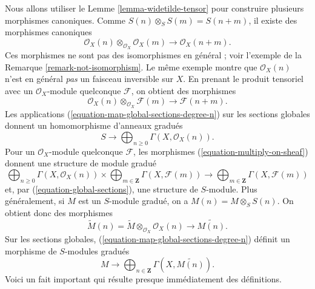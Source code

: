 \noindent
Nous allons utiliser le Lemme \ref{lemma-widetilde-tensor} pour construire
plusieurs morphismes canoniques. Comme
$S(n) \otimes_S S(m) = S(n + m)$, il existe des morphismes canoniques
\begin{equation}
\label{equation-multiply}
\mathcal{O}_X(n) \otimes_{\mathcal{O}_X} \mathcal{O}_X(m)
\longrightarrow
\mathcal{O}_X(n + m).
\end{equation}
Ces morphismes ne sont pas des isomorphismes en général ; voir l'exemple de la
Remarque \ref{remark-not-isomorphism}. Le même exemple montre que
$\mathcal{O}_X(n)$ n'est en général {\it pas} un faisceau inversible sur $X$.
En prenant le produit tensoriel avec un $\mathcal{O}_X$-module quelconque
$\mathcal{F}$, on obtient des morphismes
\begin{equation}
\label{equation-multiply-on-sheaf}
\mathcal{O}_X(n) \otimes_{\mathcal{O}_X} \mathcal{F}(m)
\longrightarrow
\mathcal{F}(n + m).
\end{equation}
Les applications (\ref{equation-map-global-sections-degree-n}) sur les
sections globales donnent un homomorphisme d'anneaux gradués
\begin{equation}
\label{equation-global-sections}
S \longrightarrow \bigoplus\nolimits_{n \geq 0} \Gamma(X, \mathcal{O}_X(n)).
\end{equation}
Pour un $\mathcal{O}_X$-module quelconque $\mathcal{F}$, les morphismes
(\ref{equation-multiply-on-sheaf}) donnent une structure de module gradué
\begin{equation}
\label{equation-global-sections-module}
\bigoplus\nolimits_{n \geq 0} \Gamma(X, \mathcal{O}_X(n))
\times
\bigoplus\nolimits_{m \in \mathbf{Z}} \Gamma(X, \mathcal{F}(m))
\longrightarrow
\bigoplus\nolimits_{m \in \mathbf{Z}} \Gamma(X, \mathcal{F}(m))
\end{equation}
et, par (\ref{equation-global-sections}), une structure de $S$-module.
Plus généralement, si $M$ est un $S$-module gradué, on a
$M(n) = M \otimes_S S(n)$. On obtient donc des morphismes
\begin{equation}
\label{equation-multiply-more-generally}
\widetilde M(n)
=
\widetilde M
\otimes_{\mathcal{O}_X}
\mathcal{O}_X(n)
\longrightarrow
\widetilde{M(n)}.
\end{equation}
Sur les sections globales, (\ref{equation-map-global-sections-degree-n})
définit un morphisme de $S$-modules gradués
\begin{equation}
\label{equation-global-sections-more-generally}
M \longrightarrow
\bigoplus\nolimits_{n \in \mathbf{Z}} \Gamma(X, \widetilde{M(n)}).
\end{equation}
Voici un fait important qui résulte presque immédiatement des définitions.

